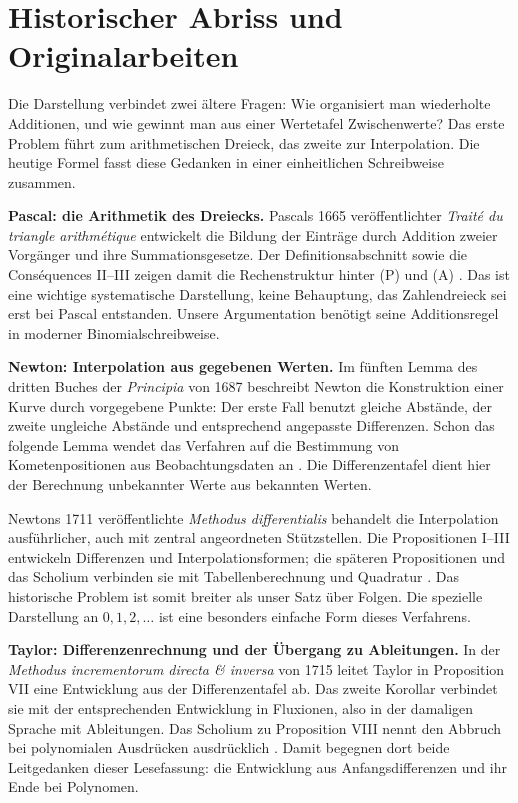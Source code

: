 \section{Historischer Abriss und Originalarbeiten}

Die Darstellung verbindet zwei ältere Fragen: Wie organisiert man
wiederholte Additionen, und wie gewinnt man aus einer Wertetafel
Zwischenwerte? Das erste Problem führt zum arithmetischen Dreieck,
das zweite zur Interpolation. Die heutige Formel fasst diese Gedanken
in einer einheitlichen Schreibweise zusammen.

\textbf{Pascal: die Arithmetik des Dreiecks.}
Pascals 1665 veröffentlichter \emph{Traité du triangle arithmétique}
entwickelt die Bildung der Einträge durch Addition zweier Vorgänger
und ihre Summationsgesetze. Der Definitionsabschnitt sowie die
Conséquences II--III zeigen damit die Rechenstruktur hinter (P) und
(A) \cite{newton:pascal-source}. Das ist eine wichtige systematische
Darstellung, keine Behauptung, das Zahlendreieck sei erst bei Pascal
entstanden. Unsere Argumentation benötigt seine Additionsregel in
moderner Binomialschreibweise.

\textbf{Newton: Interpolation aus gegebenen Werten.}
Im fünften Lemma des dritten Buches der \emph{Principia} von 1687
beschreibt Newton die Konstruktion einer Kurve durch vorgegebene
Punkte: Der erste Fall benutzt gleiche Abstände, der zweite ungleiche
Abstände und entsprechend angepasste Differenzen. Schon das folgende
Lemma wendet das Verfahren auf die Bestimmung von Kometenpositionen
aus Beobachtungsdaten an \cite[Buch~III, Lemmata~V--VI]{newton:principia}.
Die Differenzentafel dient hier der Berechnung unbekannter Werte aus
bekannten Werten.

Newtons 1711 veröffentlichte \emph{Methodus differentialis} behandelt
die Interpolation ausführlicher, auch mit zentral angeordneten
Stützstellen. Die Propositionen I--III entwickeln Differenzen und
Interpolationsformen; die späteren Propositionen und das Scholium
verbinden sie mit Tabellenberechnung und Quadratur
\cite{newton:methodus}. Das historische Problem ist somit breiter
als unser Satz über Folgen. Die spezielle Darstellung an
$0,1,2,\ldots$ ist eine besonders einfache Form dieses Verfahrens.

\textbf{Taylor: Differenzenrechnung und der Übergang zu Ableitungen.}
In der \emph{Methodus incrementorum directa \& inversa} von 1715
leitet Taylor in Proposition VII eine Entwicklung aus der
Differenzentafel ab. Das zweite Korollar verbindet sie mit der
entsprechenden Entwicklung in Fluxionen, also in der damaligen Sprache
mit Ableitungen. Das Scholium zu Proposition VIII nennt den Abbruch
bei polynomialen Ausdrücken ausdrücklich
\cite[Pars~I, S.~21--24]{newton:taylor}.
Damit begegnen dort beide Leitgedanken dieser Lesefassung: die
Entwicklung aus Anfangsdifferenzen und ihr Ende bei Polynomen.

